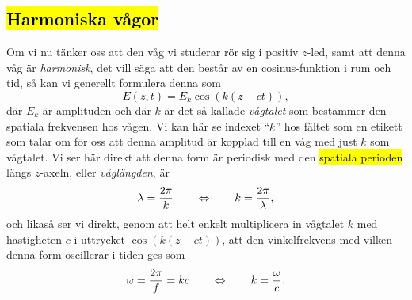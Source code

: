 \subsection{{\hl{Harmoniska v{\aa}gor}}}
Om vi nu t{\"a}nker oss att den v{\aa}g vi studerar r{\"o}r sig i positiv
$z$-led, samt att denna v{\aa}g {\"a}r {\it harmonisk}, det vill s{\"a}ga att
den best{\aa}r av en cosinus-funktion i rum och tid,
s{\aa} kan vi generellt formulera denna som
\hl{$$
  E(z,t)=E_k\cos(k(z-ct)),
$$}
d{\"a}r $E_k$ {\"a}r amplituden och d{\"a}r $k$ {\"a}r det s{\aa} kallade
{\it v{\aa}gtalet} som best{\"a}mmer den spatiala frekvensen hos v{\aa}gen.
Vi kan h{\"a}r se indexet
``$k$'' hos f{\"a}ltet som en etikett som talar om f{\"o}r oss att denna
amplitud {\"a}r kopplad till en v{\aa}g med just $k$ som v{\aa}gtalet.
\medskip
{}
\medskip
\noindent
Vi ser h{\"a}r direkt att denna form {\"a}r periodisk med den {\hl{spatiala
perioden}}
l{\"a}ngs $z$-axeln, eller {\it v{\aa}gl{\"a}ngden}, {\"a}r
\hl{$$
  \lambda={{2\pi}\over{k}}
  \qquad\Leftrightarrow\qquad
  k={{2\pi}\over{\lambda}},
$$}
och likas{\aa} ser vi direkt, genom att helt enkelt multiplicera in v{\aa}gtalet
$k$ med hastigheten $c$ i uttrycket $\cos(k(z-ct))$, att den vinkelfrekvens med
vilken denna form oscillerar i tiden ges som
\hl{$$
  \omega={{2\pi}\over{f}}=kc
  \qquad\Leftrightarrow\qquad
  k={{\omega}\over{c}}.
$$}

